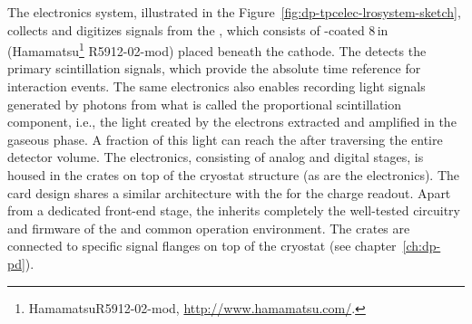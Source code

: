 The  electronics system, illustrated in the Figure~\ref{fig:dp-tpcelec-lrosystem-sketch},  collects and digitizes signals from the , which consists of -coated \num{8}\,in  (Hamamatsu\footnote{Hamamatsu\texttrademark R5912-02-mod, \url{http://www.hamamatsu.com/}.} R5912-02-mod) placed beneath the  cathode. The  detects the primary scintillation signals, which provide the absolute time reference for interaction events. The same electronics also enables recording light signals generated by photons from what is called the proportional scintillation component, i.e., the light created by the electrons extracted and amplified in the gaseous phase. A fraction of this light can reach the  after traversing the entire detector volume. The  electronics, consisting of analog and digital stages, is housed in the  crates on top of the cryostat structure (as are the  electronics). The   card design shares a similar architecture with the  for the charge readout. Apart from a dedicated front-end stage, the   inherits completely the well-tested circuitry and firmware of the   and common operation environment. The   crates are connected to specific  signal \fdth flanges on top of the cryostat (see chapter~\ref{ch:dp-pd}).

